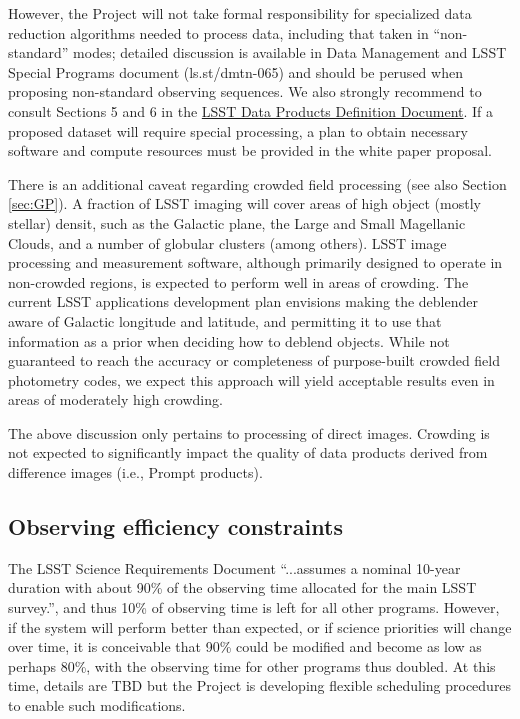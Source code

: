 \documentclass[DM,lsstdraft,toc,usenatbib]{lsstdoc}
\begin{document}
However, the Project will not take formal responsibility for specialized data reduction algorithms 
needed to process data, including that taken in ``non-standard'' modes; detailed discussion is 
available in Data Management and LSST Special Programs document (ls.st/dmtn-065) and should
be perused when proposing non-standard observing sequences. We also strongly recommend to 
consult Sections 5 and 6 in the \href{http://ls.st/dpdd}{LSST Data Products Definition Document}. If a proposed dataset will 
require special processing, a plan to obtain necessary software and compute resources must be 
provided in the white paper proposal.

There is an additional caveat regarding crowded field processing (see also Section \ref{sec:GP}). 
A fraction of LSST imaging will cover areas of high object (mostly stellar) densit, such as the 
Galactic plane, the Large and Small Magellanic Clouds, and a number of globular clusters (among 
others). LSST image processing and measurement software, although primarily designed to operate 
in non-crowded regions, is expected to perform well in areas of crowding. The current LSST applications 
development plan envisions making the deblender aware of Galactic longitude and latitude, and 
permitting it to use that information as a prior when deciding how to deblend objects. While not 
guaranteed to reach the accuracy or completeness of purpose-built crowded field photometry codes, 
we expect this approach will yield acceptable results even in areas of moderately high crowding.

The above discussion only pertains to processing of direct images. Crowding is not expected to 
significantly impact the quality of data products derived from difference images (i.e., Prompt 
products).


\subsection{Observing efficiency constraints} 

The LSST Science Requirements Document  ``...assumes a nominal 10-year duration with about 90\% 
of the observing time allocated for the main LSST survey.'', and thus 10\% of observing time is left for 
all other programs. However, if the system will perform better than expected, or if science priorities 
will change over time, it is conceivable that 90\% could be modified and become as low as perhaps 80\%, 
with the observing time for other programs thus doubled. At this time, details are TBD but the Project
is developing flexible scheduling procedures to enable such modifications. 
\end{document}
